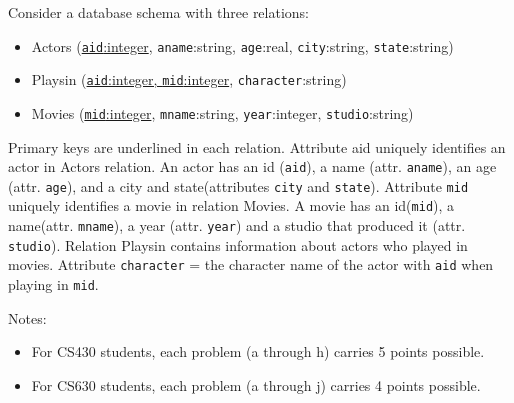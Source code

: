 \documentclass[letterpaper, 11pt]{article}
\begin{document}
Consider a database schema with three relations:
\begin{itemize}
    \item Actors (\underline{\texttt{aid}:integer}, \texttt{aname}:string, \texttt{age}:real, \texttt{city}:string, \texttt{state}:string)
    \item Playsin (\underline{\texttt{aid}:integer, \texttt{mid}:integer}, \texttt{character}:string)
    \item Movies (\underline{\texttt{mid}:integer}, \texttt{mname}:string, \texttt{year}:integer, \texttt{studio}:string)
\end{itemize}

Primary keys are underlined in each relation. Attribute aid uniquely identifies an actor in Actors relation. An actor has an id (\texttt{aid}), a name (attr. \texttt{aname}), an age (attr. \texttt{age}), and a city and state(attributes \texttt{city} and \texttt{state}). Attribute \texttt{mid} uniquely identifies a movie in relation Movies. A movie has an id(\texttt{mid}), a name(attr. \texttt{mname}), a year (attr. \texttt{year}) and a studio that produced it (attr. \texttt{studio}). Relation Playsin contains information about actors who played in movies. Attribute \texttt{character} = the character name of the actor with \texttt{aid} when playing in \texttt{mid}.

Notes:
\begin{itemize}
    \item For CS430 students, each problem (a through h) carries 5 points possible.
    \item For CS630 students, each problem (a through j) carries 4 points possible.
\end{itemize}
\end{document}
